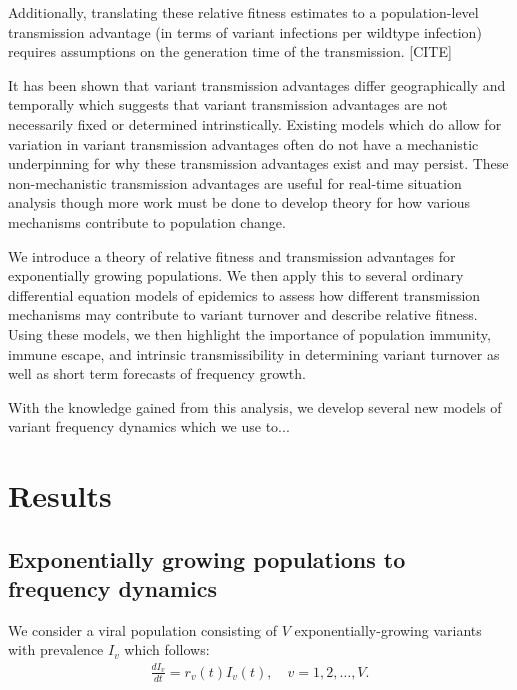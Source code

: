 \documentclass[12pt,oneside,letterpaper]{article}
\begin{document}
Additionally, translating these relative fitness estimates to a population-level transmission advantage (in terms of variant infections per wildtype infection) requires assumptions on the generation time of the transmission. [CITE]


It has been shown that variant transmission advantages differ geographically and temporally which suggests that variant transmission advantages are not necessarily fixed or determined intrinstically.
Existing models which do allow for variation in variant transmission advantages often do not have a mechanistic underpinning for why these transmission advantages exist and may persist.
These non-mechanistic transmission advantages are useful for real-time situation analysis though more work must be done to develop theory for how various mechanisms contribute to population change.

We introduce a theory of relative fitness and transmission advantages for exponentially growing populations.
We then apply this to several ordinary differential equation models of epidemics to assess how different transmission mechanisms may contribute to variant turnover and describe relative fitness.
Using these models, we then highlight the importance of population immunity, immune escape, and intrinsic transmissibility in determining variant turnover as well as short term forecasts of frequency growth.

With the knowledge gained from this analysis, we develop several new models of variant frequency dynamics which we use to...


\section*{Results}

\subsection*{Exponentially growing populations to frequency dynamics}%

We consider a viral population consisting of $V$ exponentially-growing variants with prevalence $I_{v}$ which follows:
\begin{align*}
    \frac{d I_{v}}{d t} = r_{v}(t) I_{v}(t), \quad v = 1,2, \ldots, V.
\end{align*}
\end{document}
